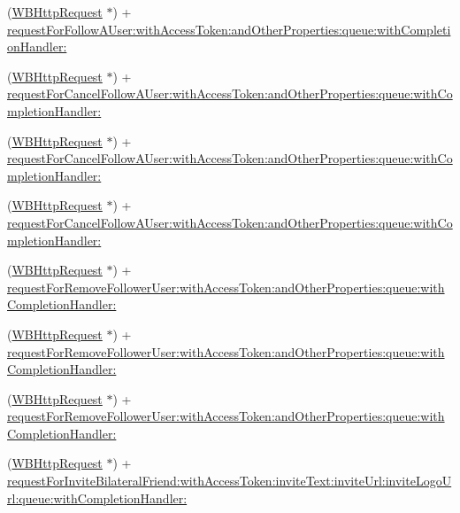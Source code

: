 \begin{DoxyCompactItemize}
\item 
(\mbox{\hyperlink{interface_w_b_http_request}{W\+B\+Http\+Request}} $\ast$) + \mbox{\hyperlink{interface_w_b_http_request_a857eebccc3b26b8d7c5bbc38a3ae2627}{request\+For\+Follow\+A\+User\+:with\+Access\+Token\+:and\+Other\+Properties\+:queue\+:with\+Completion\+Handler\+:}}
\item 
(\mbox{\hyperlink{interface_w_b_http_request}{W\+B\+Http\+Request}} $\ast$) + \mbox{\hyperlink{interface_w_b_http_request_a0a601918d65f1776f99882facc1349e3}{request\+For\+Cancel\+Follow\+A\+User\+:with\+Access\+Token\+:and\+Other\+Properties\+:queue\+:with\+Completion\+Handler\+:}}
\item 
(\mbox{\hyperlink{interface_w_b_http_request}{W\+B\+Http\+Request}} $\ast$) + \mbox{\hyperlink{interface_w_b_http_request_a0a601918d65f1776f99882facc1349e3}{request\+For\+Cancel\+Follow\+A\+User\+:with\+Access\+Token\+:and\+Other\+Properties\+:queue\+:with\+Completion\+Handler\+:}}
\item 
(\mbox{\hyperlink{interface_w_b_http_request}{W\+B\+Http\+Request}} $\ast$) + \mbox{\hyperlink{interface_w_b_http_request_a0a601918d65f1776f99882facc1349e3}{request\+For\+Cancel\+Follow\+A\+User\+:with\+Access\+Token\+:and\+Other\+Properties\+:queue\+:with\+Completion\+Handler\+:}}
\item 
(\mbox{\hyperlink{interface_w_b_http_request}{W\+B\+Http\+Request}} $\ast$) + \mbox{\hyperlink{interface_w_b_http_request_abb1e37b606f28ab890279b1ce62de963}{request\+For\+Remove\+Follower\+User\+:with\+Access\+Token\+:and\+Other\+Properties\+:queue\+:with\+Completion\+Handler\+:}}
\item 
(\mbox{\hyperlink{interface_w_b_http_request}{W\+B\+Http\+Request}} $\ast$) + \mbox{\hyperlink{interface_w_b_http_request_abb1e37b606f28ab890279b1ce62de963}{request\+For\+Remove\+Follower\+User\+:with\+Access\+Token\+:and\+Other\+Properties\+:queue\+:with\+Completion\+Handler\+:}}
\item 
(\mbox{\hyperlink{interface_w_b_http_request}{W\+B\+Http\+Request}} $\ast$) + \mbox{\hyperlink{interface_w_b_http_request_abb1e37b606f28ab890279b1ce62de963}{request\+For\+Remove\+Follower\+User\+:with\+Access\+Token\+:and\+Other\+Properties\+:queue\+:with\+Completion\+Handler\+:}}
\item 
(\mbox{\hyperlink{interface_w_b_http_request}{W\+B\+Http\+Request}} $\ast$) + \mbox{\hyperlink{interface_w_b_http_request_a82d133ab6df8bbd0b61a6bbdd56fa499}{request\+For\+Invite\+Bilateral\+Friend\+:with\+Access\+Token\+:invite\+Text\+:invite\+Url\+:invite\+Logo\+Url\+:queue\+:with\+Completion\+Handler\+:}}

\end{DoxyCompactItemize}
